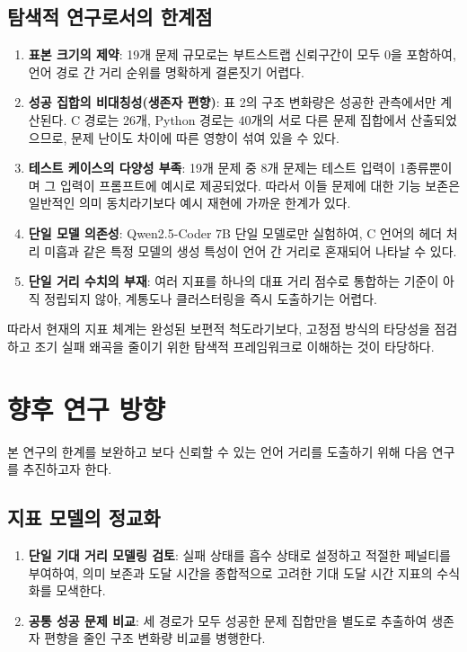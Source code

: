 \documentclass[a4paper,10pt,twocolumn,twoside]{article}
\begin{document}
\subsection{탐색적 연구로서의 한계점}
\begin{enumerate}
\item \textbf{표본 크기의 제약}: 19개 문제 규모로는 부트스트랩 신뢰구간이 모두 0을 포함하여, 언어 경로 간 거리 순위를 명확하게 결론짓기 어렵다.
\item \textbf{성공 집합의 비대칭성(생존자 편향)}: 표 2의 구조 변화량은 성공한 관측에서만 계산된다. C 경로는 26개, Python 경로는 40개의 서로 다른 문제 집합에서 산출되었으므로, 문제 난이도 차이에 따른 영향이 섞여 있을 수 있다.
\item \textbf{테스트 케이스의 다양성 부족}: 19개 문제 중 8개 문제는 테스트 입력이 1종류뿐이며 그 입력이 프롬프트에 예시로 제공되었다. 따라서 이들 문제에 대한 기능 보존은 일반적인 의미 동치라기보다 예시 재현에 가까운 한계가 있다.
\item \textbf{단일 모델 의존성}: Qwen2.5-Coder 7B 단일 모델로만 실험하여, C 언어의 헤더 처리 미흡과 같은 특정 모델의 생성 특성이 언어 간 거리로 혼재되어 나타날 수 있다.
\item \textbf{단일 거리 수치의 부재}: 여러 지표를 하나의 대표 거리 점수로 통합하는 기준이 아직 정립되지 않아, 계통도나 클러스터링을 즉시 도출하기는 어렵다.
\end{enumerate}

따라서 현재의 지표 체계는 완성된 보편적 척도라기보다, 고정점 방식의 타당성을 점검하고 조기 실패 왜곡을 줄이기 위한 탐색적 프레임워크로 이해하는 것이 타당하다.

\section{향후 연구 방향}

본 연구의 한계를 보완하고 보다 신뢰할 수 있는 언어 거리를 도출하기 위해 다음 연구를 추진하고자 한다.

\subsection{지표 모델의 정교화}
\begin{enumerate}
\item \textbf{단일 기대 거리 모델링 검토}: 실패 상태를 흡수 상태로 설정하고 적절한 페널티를 부여하여, 의미 보존과 도달 시간을 종합적으로 고려한 기대 도달 시간 지표의 수식화를 모색한다.
\item \textbf{공통 성공 문제 비교}: 세 경로가 모두 성공한 문제 집합만을 별도로 추출하여 생존자 편향을 줄인 구조 변화량 비교를 병행한다.
\end{enumerate}
\end{document}
